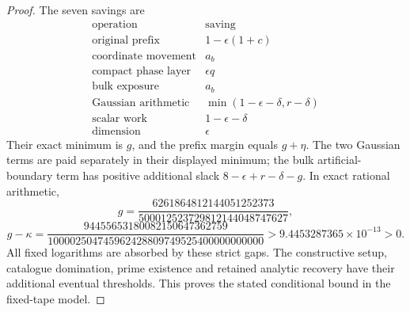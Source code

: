 \begin{proof}
The seven savings are
\[
\begin{array}{c|c}
\text{operation}&\text{saving}\\\hline
\text{original prefix}&1-\epsilon(1+c)\\
\text{coordinate movement}&a_b\\
\text{compact phase layer}&\epsilon q\\
\text{bulk exposure}&a_b\\
\text{Gaussian arithmetic}&\min(1-\epsilon-\delta,r-\delta)\\
\text{scalar work}&1-\epsilon-\delta\\
\text{dimension}&\epsilon
\end{array}
\]
Their exact minimum is $g$, and the prefix margin equals $g+\eta$.
The two Gaussian terms are paid separately in their displayed minimum;
the bulk artificial-boundary term has positive additional slack
$8-\epsilon+r-\delta-g$. In exact rational arithmetic,
\[
 g=\frac{6261864812144051252373}{500012523729812144048747627},
\]
\[
 g-\kappa=
 \frac{94455653180082150647362759}
      {100002504745962428809749525400000000000}
 >9.4453287365\times10^{-13}>0.
\]
All fixed logarithms are absorbed by these strict gaps. The constructive
setup, catalogue domination, prime existence and retained analytic
recovery have their additional eventual thresholds. This proves the
stated conditional bound in the fixed-tape model.
\end{proof}
